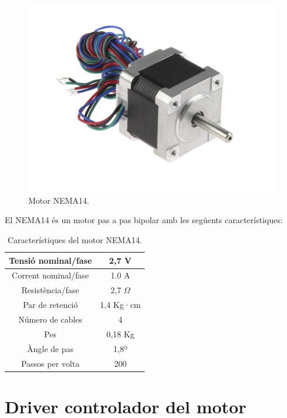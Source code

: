 \begin{figure}[H]
	\centering
	\includegraphics[scale=2]{NEMA14}
	\caption{Motor NEMA14.}
	\label{fig:NEMA14}
\end{figure}

El NEMA14 és un motor pas a pas bipolar amb les següents característiques: 

\begin{table}[htbp]
	\begin{center}
		\begin{tabular}{|c|c|}
			\hline
			
			Tensió nominal/fase & 2,7 V  \\ \hline
			Corrent nominal/fase & 1.0 A  \\ \hline
			Resistència/fase & 2,7 $\Omega$  \\ \hline
			Par de retenció & 1,4 Kg·cm  \\ \hline
			Número de cables & 4  \\ \hline
			Pes & 0,18 Kg  \\ \hline
			Àngle de pas & 1,8º  \\ \hline
			Passos per volta & 200  \\ \hline
		\end{tabular}
		\caption{Característiques del motor NEMA14.}
		\label{tabla:NEMA14}
	\end{center}
\end{table}



\section {Driver controlador del motor}\label{sec:driver}

